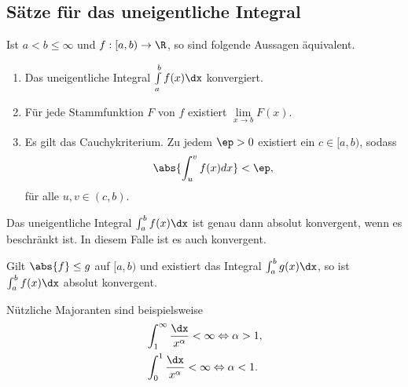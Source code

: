 \subsection{Sätze für das uneigentliche Integral}
\begin{prop}
Ist $a<b\le\infty$ und $f: [a,b)\to\R$, so sind folgende Aussagen äquivalent.
\begin{enumerate}
  \item Das uneigentliche Integral $\int\limits_a^b f(x)\dx$ konvergiert.
  \item Für jede Stammfunktion $F$ von $f$ existiert $\lim\limits_{x\to b}
  F(x)$.
  \item Es gilt das Cauchykriterium. Zu jedem $\ep > 0$ existiert ein
  $c\in[a,b)$, sodass
  \begin{align*}
  \abs{\int_u^v f(x) dx} < \ep, 
  \end{align*}
  für alle $u,v\in (c,b)$.
\end{enumerate}
\end{prop}
\begin{prop}
Das uneigentliche Integral $\int_a^b f(x)\dx$ ist genau dann absolut
konvergent, wenn es beschränkt ist. In diesem Falle ist es auch
konvergent.
\end{prop}
\begin{prop}[Majorantenkriterium]
Gilt $\abs{f}\le g$ auf $[a,b)$ und existiert das Integral $\int_a^b g(x)\dx$,
so ist $\int_a^b f(x)\dx$ absolut konvergent.
\end{prop}
\begin{prop}
Nützliche Majoranten sind beispielsweise
\begin{align*}
  &\int_1^\infty \frac{\dx}{x^\alpha} < \infty \Leftrightarrow \alpha >
  1,\\
  &\int_0^1 \frac{\dx}{x^\alpha} < \infty \Leftrightarrow \alpha <
  1.
\end{align*}
\end{prop}